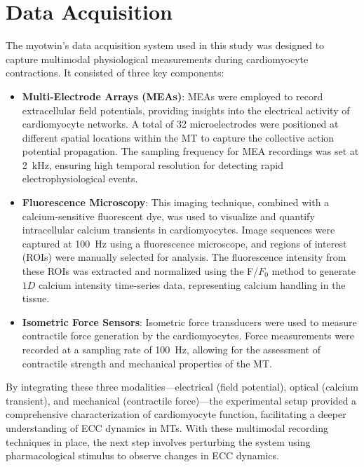 \documentclass{report}
\begin{document}
        \section{Data Acquisition}
        \label{sec:daq}
            The myotwin's data acquisition system used in this study was designed to capture multimodal physiological measurements during cardiomyocyte contractions. It consisted of three key components:
            
            \begin{itemize}
                \item \textbf{Multi-Electrode Arrays (MEAs)}: MEAs were employed to record extracellular field potentials, providing insights into the electrical activity of cardiomyocyte networks. A total of 32 microelectrodes were positioned at different spatial locations within the MT to capture the collective action potential propagation. The sampling frequency for MEA recordings was set at \SI{2}{\kHz}, ensuring high temporal resolution for detecting rapid electrophysiological events.
    
                \item \textbf{Fluorescence Microscopy}: This imaging technique, combined with a calcium-sensitive fluorescent dye, was used to visualize and quantify intracellular calcium transients in cardiomyocytes. Image sequences were captured at \SI{100}{\hertz} using a fluorescence microscope, and regions of interest (ROIs) were manually selected for analysis. The fluorescence intensity from these ROIs was extracted and normalized using the F/$F_0$ method to generate $1D$ calcium intensity time-series data, representing calcium handling in the tissue.
            
                \item \textbf{Isometric Force Sensors}: Isometric force transducers were used to measure contractile force generation by the cardiomyocytes. Force measurements were recorded at a sampling rate of \SI{100}{\hertz}, allowing for the assessment of contractile strength and mechanical properties of the MT.
            
            \end{itemize}
    
            By integrating these three modalities—electrical (field potential), optical (calcium transient), and mechanical (contractile force)—the experimental setup provided a comprehensive characterization of cardiomyocyte function, facilitating a deeper understanding of ECC dynamics in MTs. With these multimodal recording techniques in place, the next step involves perturbing the system using pharmacological stimulus to observe changes in ECC dynamics.
    
\end{document}
